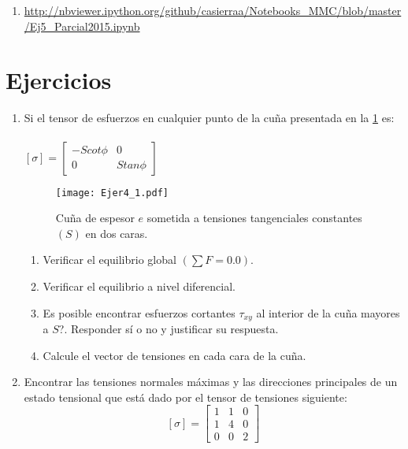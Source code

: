 \documentclass[../notas medios.tex]{subfiles}
\begin{document}
\begin{enumerate} 
\item \small{\url{http://nbviewer.ipython.org/github/casierraa/Notebooks_MMC/blob/master/Ej5_Parcial2015.ipynb}}
\end{enumerate}

\newpage
\section{Ejercicios}


\begin{enumerate}
  
\item \label{punto01} Si el tensor de esfuerzos en cualquier punto de la cu\~na
presentada en la \cref{figure4} es:\\
	\\
	$[\sigma] = \left[ \begin{array}{ccc}
	-S cot \phi & 0 \\ 
	0 & S tan \phi
	\end{array}  \right] $\\
	\begin{figure}[H]
		\centering
		\texttt{[image: Ejer4\_1.pdf]}
		\caption{Cuña de espesor $e$ sometida a tensiones tangenciales constantes $(S)$ en dos caras.}
		\label{figure4}
	\end{figure}
	\begin{enumerate}
		\item Verificar el equilibrio global $\left( \sum F = 0.0 \right)$.
		\item Verificar el equilibrio a nivel diferencial.
		\item  \textquestiondown Es posible encontrar esfuerzos cortantes $\tau_{xy}$ al interior de la cu\~na mayores a $S$?. Responder s\'i o no y justificar su respuesta.
		\item Calcule el vector de tensiones en cada cara de la cu\~na. 
	\end{enumerate}

\item \label{punto02} Encontrar las tensiones normales máximas y las direcciones
principales de un estado tensional que est\'a dado por el tensor de tensiones siguiente:
%
\[ [\sigma] = \left[ \begin{array}{ccc}
	1 & 1 & 0 \\ 
	1 & 4 & 0 \\ 
	0 & 0 & 2
\end{array}  \right]\]


\end{enumerate}
\end{document}
